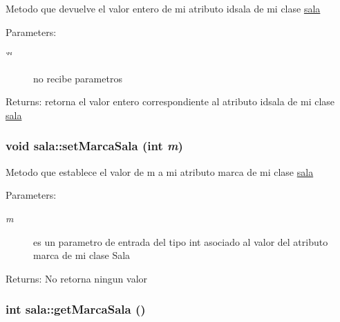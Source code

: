 Metodo que devuelve el valor entero de mi atributo idsala de mi clase \hyperlink{classsala}{sala} \begin{Desc}
\item[Parameters:]
\begin{description}
\item[{\em \char`\"{}\char`\"{}}]no recibe parametros \end{description}
\end{Desc}
\begin{Desc}
\item[Returns:]retorna el valor entero correspondiente al atributo idsala de mi clase \hyperlink{classsala}{sala} \end{Desc}
\hypertarget{classsala_74d517148cdcaf0aa1a58bc877f9c910}{
\subsubsection[setMarcaSala]{\setlength{\rightskip}{0pt plus 5cm}void sala::setMarcaSala (int {\em m})}}
\label{classsala_74d517148cdcaf0aa1a58bc877f9c910}


Metodo que establece el valor de m a mi atributo marca de mi clase \hyperlink{classsala}{sala} \begin{Desc}
\item[Parameters:]
\begin{description}
\item[{\em m}]es un parametro de entrada del tipo int asociado al valor del atributo marca de mi clase Sala \end{description}
\end{Desc}
\begin{Desc}
\item[Returns:]No retorna ningun valor \end{Desc}
\hypertarget{classsala_099a7d79e8142f14dacfcc869f5557c3}{
\subsubsection[getMarcaSala]{\setlength{\rightskip}{0pt plus 5cm}int sala::getMarcaSala ()}}
\label{classsala_099a7d79e8142f14dacfcc869f5557c3}


